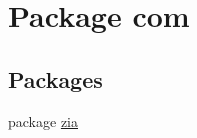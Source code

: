 \hypertarget{namespacecom}{\section{Package com}
\label{namespacecom}
}
\subsection*{Packages}
\begin{DoxyCompactItemize}
\item 
package \hyperlink{namespacecom_1_1zia}{zia}
\end{DoxyCompactItemize}
